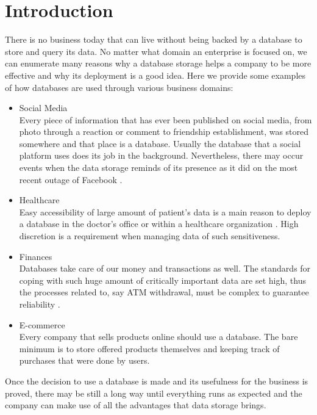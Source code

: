 \chapter{Introduction}

There is no business today that can live without being backed by a database to store and query its data.
No matter what domain an enterprise is focused on, we can enumerate many reasons why a database storage helps a company to be more effective and why its deployment is a good idea.
Here we provide some examples of how databases are used through various business domains:

\begin{itemize}
	
	\item Social Media \\
	Every piece of information that has ever been published on social media, from photo through a reaction or comment to friendship establishment, was stored somewhere and that place is a database. Usually the database that a social platform uses does its job in the background. Nevertheless, there may occur events when the data storage reminds of its presence as it did on the most recent outage of Facebook \cite{Facebook19}.
	
	\item Healthcare \\
	Easy accessibility of large amount of patient's data is a main reason to deploy a database in the doctor's office or within a healthcare organization \cite{Healthcare13}. High discretion is a requirement when managing data of such sensitiveness.
	
	\item Finances \\
	Databases take care of our money and transactions as well. The standards for coping with such huge amount of critically important data are set high, thus the processes related to, say ATM withdrawal, must be complex to guarantee reliability \cite{BanksCaixa}.
	
	\item E-commerce \\
	Every company that sells products online should use a database. The bare minimum is to store offered products themselves and keeping track of purchases that were done by users.
\end{itemize}

Once the decision to use a database is made and its usefulness for the business is proved, there may be still a long way until everything runs as expected and the company can make use of all the advantages that data storage brings.

